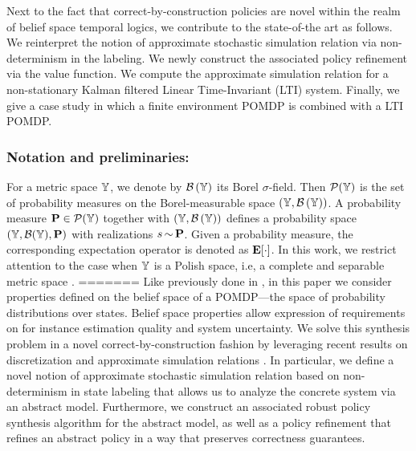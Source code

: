 \documentclass{ifacconf}
\begin{document}
Next to the fact that correct-by-construction policies are novel within the realm of belief space temporal logics, we contribute to the state-of-the art as follows. 
 We reinterpret the notion of approximate stochastic simulation relation via non-determinism in the labeling. We newly construct the associated policy refinement via the value function. We compute the approximate simulation relation for a non-stationary Kalman filtered  Linear Time-Invariant (LTI) system.   Finally,  we give a case study in which a finite environment POMDP is combined with a LTI POMDP.
 


\subsubsection{Notation and preliminaries:}

For a metric space ${\mathbb{Y}}$, we denote by $\mathcal{B}\left({\mathbb{Y}}\right)$ its Borel $\sigma$-field. Then $\mathcal P({\mathbb{Y}})$ is the set of probability measures on the Borel-measurable space $({\mathbb{Y}},\mathcal{B}\left({\mathbb{Y}}\right))$. A probability measure $\mathbf{P} \in \mathcal P({\mathbb{Y}})$ together with $({\mathbb{Y}},\mathcal{B}\left({\mathbb{Y}}\right))$ defines a probability space $({\mathbb{Y}},\mathcal{B}({\mathbb{Y}}),\mathbf{P})$ with realizations $s{\,\sim\,}\mathbf{P}$. Given a probability measure, the corresponding expectation operator is denoted as $\mathbf{E}[\cdot]$. In this work, we restrict attention to the case when ${\mathbb{Y}}$ is a Polish space, i.e, a complete and separable metric space \citep{bogachev2007measure}.
=======
Like previously done in  \citep{Vasile2016,JonesDTL2013}, in this paper we consider properties defined on the belief space of a POMDP---the space of probability distributions over states. Belief space properties allow expression of requirements on for instance estimation quality and system uncertainty. We solve this synthesis problem in a novel correct-by-construction fashion by leveraging recent results on discretization and approximate simulation relations \citep{haesaert2017verification, tech_report_TACAS}. In particular, we define a novel notion of approximate stochastic simulation relation based on non-determinism in state labeling that allows us to analyze the concrete system via an abstract model. Furthermore, we construct an associated robust policy synthesis algorithm for the abstract model, as well as a policy refinement that refines an abstract policy in a way that preserves correctness guarantees.
\end{document}
